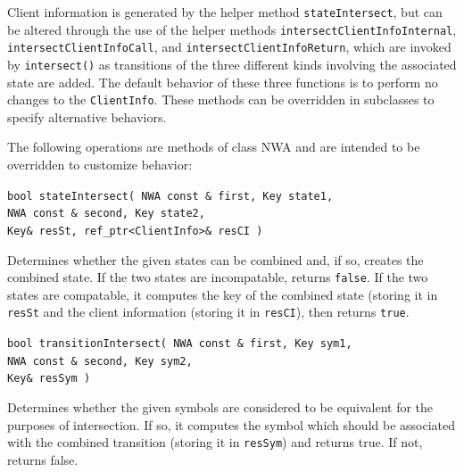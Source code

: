 Client information is generated by the helper method \texttt{stateIntersect},
but can be altered through the use of the helper methods
\texttt{intersectClientInfoInternal}, \texttt{intersectClientInfoCall}, and
\texttt{intersect\-Client\-InfoReturn}, which are invoked by
\texttt{intersect()} as transitions of the three different kinds involving the
associated state are added.  The default behavior of these three functions is
to perform no changes to the \texttt{ClientInfo}.  These methods can be
overridden in subclasses to specify alternative behaviors.

\goodbreak
\noindent The following operations are methods of class NWA and are intended
to be overridden to customize behavior:

\begin{description}

  \item\texttt{bool stateIntersect( NWA const \& first, Key state1,\\ 
                   \hspace*{3.25cm} NWA const \& second, Key state2,\\
                   \hspace*{3.25cm} Key\& resSt, ref\_ptr<ClientInfo>\& resCI )}
    \nopagebreak

    Determines whether the given states can be combined and,
    if so, creates the combined state. If the two states are incompatable,
    returns \texttt{false}. If the two states are compatable, it computes the
    key of the combined state (storing it in \texttt{resSt} and the client
    information (storing it in \texttt{resCI}), then returns \texttt{true}.

  \item\texttt{bool transitionIntersect( NWA const \& first, Key
    sym1,\\ \hspace*{3.25cm} NWA const \& second, Key
    sym2,\\ \hspace*{3.25cm} Key\& resSym )} \nopagebreak

    Determines whether the given symbols are considered to be equivalent for
    the purposes of intersection. If so, it computes the symbol which should
    be associated with the combined transition (storing it in
    \texttt{resSym}) and returns true. If not, returns false.


\end{description}
